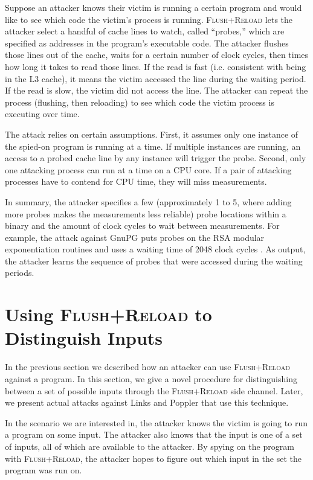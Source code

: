 \documentclass[letterpaper,twocolumn,10pt]{article}
\begin{document}
Suppose an attacker knows their victim is running a certain program and would
like to see which code the victim's process is running. \textsc{Flush+Reload}
lets the attacker select a handful of cache lines to watch, called ``probes,''
which are specified as addresses in the program's executable code.
The attacker flushes those lines out of the cache, waits for a certain number of
clock cycles, then times how long it takes to read those lines. If the read is
fast (i.e. consistent with being in the L3 cache), it means the victim accessed
the line during the waiting period. If the read is slow, the victim did not
access the line. The attacker can repeat the process (flushing, then reloading)
to see which code the victim process is executing over time.

The attack relies on certain assumptions.  First, it
assumes only one instance of the spied-on program is running at
a time. If multiple instances are running, an access to a probed cache line by
any instance will trigger the probe. Second, only one attacking process can run at
a time on a CPU core. If a pair of attacking processes have to contend for CPU
time, they will miss measurements.

In summary, the attacker specifies a few (approximately 1 to 5, where adding more
probes makes the measurements less reliable) probe locations within a binary and
the amount of clock cycles to wait between measurements.
For example, the attack against GnuPG puts probes on the RSA modular
exponentiation routines and uses a waiting time of 2048 clock cycles
\cite{yarom2013flush}.
As output, the attacker
learns the sequence of probes that were accessed during the waiting periods.

\section{Using \textsc{Flush+Reload} to Distinguish Inputs}
\label{sec:distinguishing}

In the previous section we described how an attacker can use
\textsc{Flush+Reload} against a program.
In this
section, we give a novel procedure for distinguishing between a set of possible
inputs through the \textsc{Flush+Reload} side channel. Later, we present actual
attacks against Links and Poppler that use this technique.

In the scenario we are interested in, the attacker knows the victim is going to
run a program on some input. The attacker also knows that the input is one of a set
of inputs, all of which are available to the attacker. By spying on the program
with \textsc{Flush+Reload}, the attacker hopes to figure out which input in the
set the program was run on.
\end{document}
